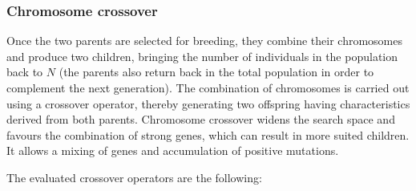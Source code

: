 \documentclass[twocol]{ametsoc}
\begin{document}
\subsubsection{Chromosome crossover}

Once the two parents are selected for breeding, they combine their chromosomes and produce two children, bringing the number of individuals in the population back to $N$ (the parents also return back in the total population in order to complement the next generation). The combination of chromosomes is carried out using a crossover operator, thereby generating two offspring having characteristics derived from both parents. Chromosome crossover widens the search space and favours the combination of strong genes, which can result in more suited children. It allows a mixing of genes and accumulation of positive mutations.

The evaluated crossover operators are the following:
\end{document}
